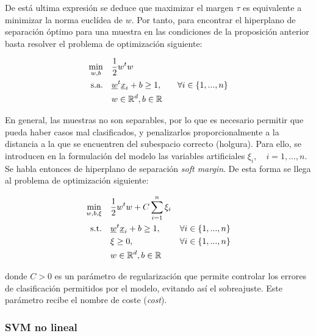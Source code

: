 \documentclass[12pt,a4paper,]{book}
\numberwithin{dummy}{section}
\theoremstyle{ocrenumbox}
\theoremstyle{blacknumex}
\theoremstyle{blacknumbox}
\theoremstyle{ocrenum}
\theoremstyle{ocrenum}
\begin{document}
De está ultima expresión se deduce que maximizar el margen \(\tau\) es
equivalente a minimizar la norma euclídea de \(w\). Por tanto, para
encontrar el hiperplano de separación óptimo para una muestra en las
condiciones de la proposición anterior basta resolver el problema de
optimización siguiente:

\begin{equation}
\begin{aligned}
\min_{w,b} \quad & \frac{1}{2}w^{t}w\\
\textrm{s.a.} \quad & \underline w^t \underline x_i+b \ge 1, \quad & \forall i\in \{1,...,n\} \\
  & w \in \mathbb{R}^d, \space b \in \mathbb{R} \\ 
\end{aligned}
\end{equation}

En general, las muestras no son separables, por lo que es necesario
permitir que pueda haber casos mal clasificados, y penalizarlos
proporcionalmente a la distancia a la que se encuentren del subespacio
correcto (holgura). Para ello, se introducen en la formulación del
modelo las variables artificiales \(\xi_i,\quad i=1,...,n\). Se habla
entonces de hiperplano de separación \emph{soft margin}. De esta forma
se llega al problema de optimización siguiente:

\begin{equation}
\begin{aligned}
\min_{w,b,\xi} \quad & \frac{1}{2}w^{t}w+C\sum_{i=1}^{n}{\xi_{i}}\\
\textrm{s.t.} \quad & \underline w^t \underline x_i+b \ge 1, \quad & \forall i\in \{1,...,n\}\\
  &\xi\geq0,   \quad & \forall i\in \{1,...,n\} \\
  & w \in \mathbb{R}^d, \space b \in \mathbb{R} \\
\end{aligned}
\end{equation}

donde \(C>0\) es un parámetro de regularización que permite controlar
los errores de clasificación permitidos por el modelo, evitando así el
sobreajuste. Este parámetro recibe el nombre de coste (\emph{cost}).

\hypertarget{svm-no-lineal}{%
\subsubsection{SVM no lineal}\label{svm-no-lineal}}
\end{document}
